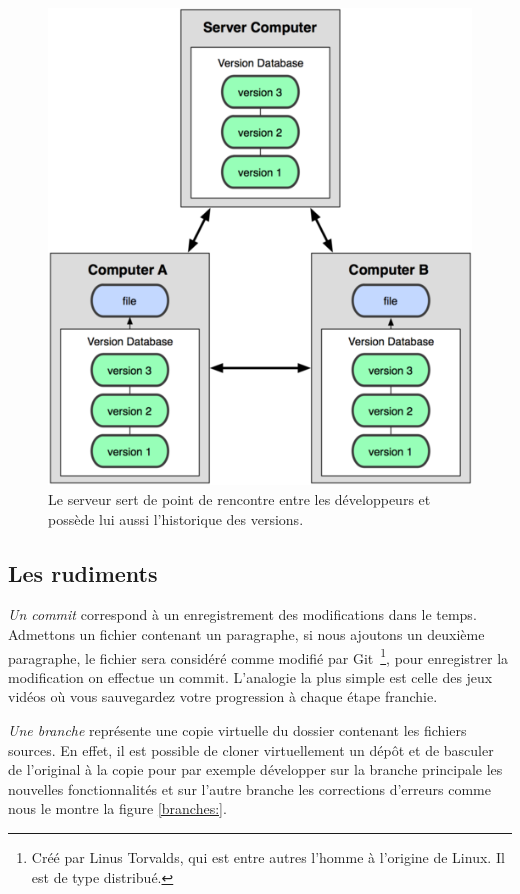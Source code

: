 \begin{figure}
\begin{center}
\includegraphics[scale=0.8]{images/workflow.png}
\caption{Le serveur sert de point de rencontre entre les développeurs et possède
lui aussi l’historique des versions.}
\label{workflow:}
\end{center}
\end{figure}

\subsection{Les rudiments}

\emph{Un commit} correspond à un enregistrement des modifications dans le
temps. Admettons un fichier contenant un paragraphe, si nous ajoutons un
deuxième paragraphe, le fichier sera considéré comme modifié par Git\,
\footnote{Créé par Linus Torvalds, qui est entre autres l'homme à l'origine de
Linux. Il est de type distribué.}, pour enregistrer la modification on effectue
un commit. L'analogie la plus simple est celle des jeux vidéos où vous
sauvegardez votre progression à chaque étape franchie.

\emph{Une branche} représente une \og copie virtuelle \fg{} du dossier
contenant les fichiers sources. En effet, il est possible de cloner
virtuellement un dépôt et de basculer de l'original à la copie pour par exemple
développer sur la branche principale les nouvelles fonctionnalités et sur
l'autre branche les corrections d'erreurs comme nous le montre la figure
\ref{branches:}.

